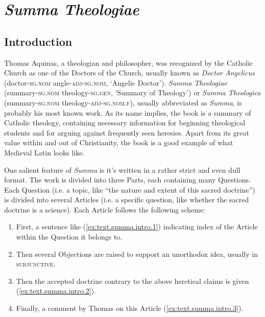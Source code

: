 \documentclass[a4paper, oneside, 12pt]{report}
\newcommand{\form}[1]{\emph{#1}}
\newcommand*{\category}[1]{\textsc{#1}}
\newcommand{\translate}[1]{`#1'}
\newcommand{\literature}[1]{\textit{#1}}
\begin{document}
\section{\literature{Summa Theologiae}}

\subsection{Introduction}

Thomas Aquinas, a theologian and philosopher, 
was recognized by the Catholic Church 
as one of the Doctors of the Church,
usually known as \form{Doctor Angelicus} 
(doctor-\category{sg.nom} angle-\category{adj}-\category{sg.nom}, 
\translate{Angelic Doctor}).
\literature{Summa Theologiae}
(summary-\category{sg.nom} theology-\category{sg.gen}, \translate{Summary of Theology}) 
or \literature{Summa Theologica} 
(summary-\category{sg.nom} theology-\category{adj}-\category{sg.nom.f}),
usually abbreviated as \literature{Summa},
is probably his most known work.
As its name implies, the book is a summary of Catholic theology,
containing necessary information for 
beginning theological students 
and for arguing against frequently seen heresies. 
Apart from its great value within and out of Christianity, 
the book is a good example of 
what Medieval Latin looks like.

One salient feature of \literature{Summa} is 
it's written in a rather strict and even dull format.
The work is divided into three Parts,
each containing many Questions.
Each Question (i.e. a topic, like ``the nature and extent of this sacred doctrine'') 
is divided into several Articles 
(i.e. a specific question, like whether the sacred doctrine is a science).
Each Article follows the following scheme: 
\begin{enumerate}
    \item First, a sentence like (\ref{ex:text.summa.intro.1}) 
    indicating index of the Article within the Question it belongs to.
    \item Then several Objections are raised to support an unorthodox idea,
    usually in \category{subjunctive}.
    \item Then the accepted doctrine contrary to the above heretical claims is given
    (\ref{ex:text.summa.intro.2}).
    \item Finally, a comment by Thomas on this Article (\ref{ex:text.summa.intro.3}).
\end{enumerate}
\end{document}
